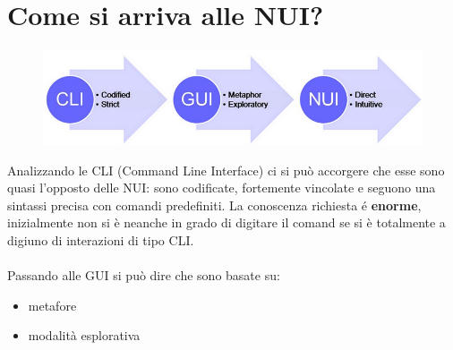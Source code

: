 \section{Come si arriva alle NUI?}
\begin{figure}[!h]
	\centering
	\includegraphics[scale=0.4]{immagini/CLItoNUI.png}
	\caption{}
\end{figure}
Analizzando le CLI (Command Line Interface) ci si può accorgere che esse sono quasi l'opposto delle NUI: sono codificate, fortemente vincolate e seguono una sintassi precisa con comandi predefiniti.
La conoscenza richiesta é \textbf{enorme}, inizialmente non si è neanche in grado di digitare il comand  se si è totalmente a digiuno di interazioni di tipo CLI.
\\
\\Passando alle GUI si può dire che sono basate su:
\begin{itemize}
\item metafore
\item modalità esplorativa
\end{itemize}

